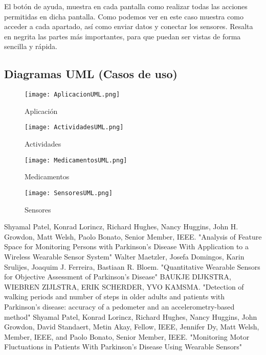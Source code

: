 \documentclass[11pt,spanish]{article}
\begin{document}
El botón de ayuda, muestra en cada pantalla como realizar todas las acciones permitidas en dicha pantalla. Como podemos ver en este caso muestra como acceder a cada apartado, así como enviar datos y conectar los sensores. Resalta en negrita las partes más importantes, para que puedan ser vistas de forma sencilla y rápida.
\newpage

\subsection{Diagramas UML (Casos de uso)}
\begin{figure}[!htb]
  \texttt{[image: AplicacionUML.png]}
  \caption{Aplicación}
\endminipage\hfill
{}
  \texttt{[image: ActividadesUML.png]}
  \caption{Actividades}
\endminipage\hfill
\end{figure}

\begin{figure}[!htb]
%
  \texttt{[image: MedicamentosUML.png]}
  \caption{Medicamentos}
\endminipage
{}%
  \texttt{[image: SensoresUML.png]}
  \caption{Sensores}
\endminipage
\end{figure}

\newpage
\begin{thebibliography}{10}
    Shyamal Patel, Konrad Lorincz, Richard Hughes, Nancy Huggins, John H. Growdon, Matt Welsh, Paolo 		Bonato, Senior Member, IEEE. "Analysis of Feature Space for Monitoring Persons with Parkinson’s
	Disease With Application to a Wireless Wearable Sensor System"
    Walter Maetzler, Josefa Domingos, Karin Srulijes, Joaquim J. Ferreira, Bastiaan R. Bloem.       	     "Quantitative Wearable Sensors for Objective Assessment of Parkinson’s Disease"
    BAUKJE DIJKSTRA, WIEBREN ZIJLSTRA, ERIK SCHERDER, YVO KAMSMA. "Detection of walking periods and 	     number of steps in older adults and patients with Parkinson’s disease: accuracy of a pedometer and       an accelerometry-based method"
    Shyamal Patel, Konrad Lorincz, Richard Hughes, Nancy Huggins, John Growdon, David Standaert, Metin       Akay, Fellow, IEEE, Jennifer Dy, Matt Welsh, Member, IEEE, and Paolo Bonato, Senior Member, IEEE.       "Monitoring Motor Fluctuations in Patients With Parkinson’s Disease Using Wearable Sensors"
\end{thebibliography}
\end{document}
